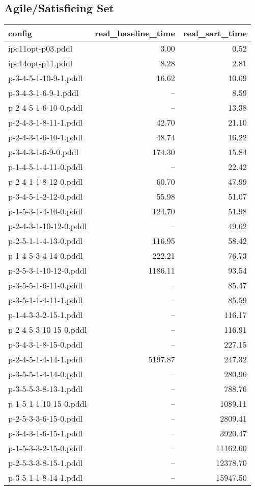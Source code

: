 \documentclass{article}
\begin{document}
                    \subsection*{Agile/Satisficing Set}
                    
                            \begin{center}
                            \scriptsize
                            \begin{tabular}{@{}l|r|r@{}}
                            config & real\_baseline\_time & real\_sart\_time\\\midrule
                             ipc11opt-p03.pddl&3.00&0.52\\
 ipc14opt-p11.pddl&8.28&2.81\\
 p-3-4-5-1-10-9-1.pddl&16.62&10.09\\
 p-3-4-3-1-6-9-1.pddl&--&8.59\\
 p-2-4-5-1-6-10-0.pddl&--&13.38\\
 p-2-4-3-1-8-11-1.pddl&42.70&21.10\\
 p-2-4-3-1-6-10-1.pddl&48.74&16.22\\
 p-3-4-3-1-6-9-0.pddl&174.30&15.84\\
 p-1-4-5-1-4-11-0.pddl&--&22.42\\
 p-2-4-1-1-8-12-0.pddl&60.70&47.99\\
 p-3-4-5-1-2-12-0.pddl&55.98&51.07\\
 p-1-5-3-1-4-10-0.pddl&124.70&51.98\\
 p-2-4-3-1-10-12-0.pddl&--&49.62\\
 p-2-5-1-1-4-13-0.pddl&116.95&58.42\\
 p-1-4-5-3-4-14-0.pddl&222.21&76.73\\
 p-2-5-3-1-10-12-0.pddl&1186.11&93.54\\
 p-3-5-5-1-6-11-0.pddl&--&85.47\\
 p-3-5-1-1-4-11-1.pddl&--&85.59\\
 p-1-4-3-3-2-15-1.pddl&--&116.17\\
 p-2-4-5-3-10-15-0.pddl&--&116.91\\
 p-3-4-3-1-8-15-0.pddl&--&227.15\\
 p-2-4-5-1-4-14-1.pddl&5197.87&247.32\\
 p-3-5-5-1-4-14-0.pddl&--&280.96\\
 p-3-5-5-3-8-13-1.pddl&--&788.76\\
 p-1-5-1-1-10-15-0.pddl&--&1089.11\\
 p-2-5-3-3-6-15-0.pddl&--&2809.41\\
 p-3-4-3-1-6-15-1.pddl&--&3920.47\\
 p-1-5-3-3-2-15-0.pddl&--&11162.60\\
 p-2-5-3-3-8-15-1.pddl&--&12378.70\\
 p-3-5-1-1-8-14-1.pddl&--&15947.50
                            \end{tabular}
                            \end{center}
                    
\end{document}

